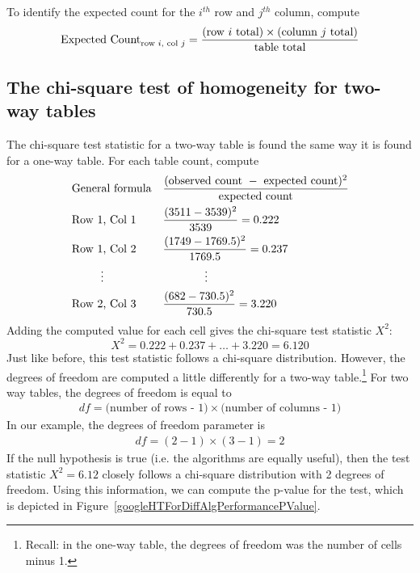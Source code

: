\begin{termBox}{
To identify the expected count for the $i^{th}$ row and $j^{th}$ column, compute
$$\text{Expected Count}_{\text{row }i,\text{ col }j} = \frac{(\text{row $i$ total}) \times  (\text{column $j$ total})}{\text{table total}}\vspace{2mm}$$}
\end{termBox}


\subsection{The chi-square test of homogeneity for two-way tables}

The chi-square test statistic for a two-way table is found the same way it is found for a one-way table. For each table count, compute
\begin{align*}
&\text{General formula}& &\frac{(\text{observed count } - \text{ expected count})^2}{\text{expected count}} \\
&\text{Row 1, Col 1}& &\frac{(3511 - 3539)^2}{3539} = 0.222 \\
&\text{Row 1, Col 2}& &\frac{(1749 - 1769.5)^2}{1769.5} = 0.237 \\
& \hspace{9mm}\vdots & &\hspace{13mm}\vdots \\
&\text{Row 2, Col 3}& &\frac{(682 - 730.5)^2}{730.5} = 3.220
\end{align*}
Adding the computed value for each cell gives the chi-square test statistic $X^2$:
$$X^2 = 0.222 + 0.237 + \dots + 3.220 = 6.120$$
Just like before, this test statistic follows a chi-square distribution. However, the degrees of freedom are computed a little differently for a two-way table.\footnote{Recall: in the one-way table, the degrees of freedom was the number of cells minus 1.} For two way tables, the degrees of freedom is equal to
\begin{align*}
df = \text{(number of rows - 1)}\times \text{(number of columns - 1)}
\end{align*}
In our example, the degrees of freedom parameter is
\begin{align*}
df = (2-1)\times (3-1) = 2
\end{align*}
If the null hypothesis is true (i.e. the algorithms are equally useful), then the test statistic $X^2 = 6.12$ closely follows a chi-square distribution with 2 degrees of freedom. Using this information, we can compute the p-value for the test, which is depicted in Figure~\ref{googleHTForDiffAlgPerformancePValue}.

